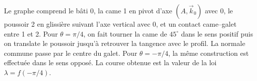 \begin{corrigebox}
Le graphe comprend le bâti 0, la came 1 en pivot d'axe $(A,\vec k_0)$
                avec 0, le poussoir 2 en glissière suivant l'axe vertical avec 0, et un
                contact came--galet entre 1 et 2.
Pour $\theta=\pi/4$, on fait tourner la came de $45^\circ$ dans le
                sens positif puis on translate le poussoir jusqu'à retrouver la tangence
                avec le profil. La normale commune passe par le centre du galet.
Pour $\theta=-\pi/4$, la même construction est effectuée dans le sens
                opposé. La course obtenue est la valeur de la loi $\lambda=f(-\pi/4)$.
\end{corrigebox}
